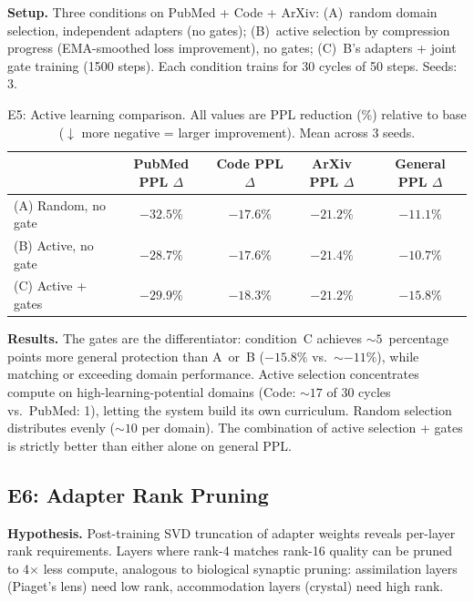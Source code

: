 \documentclass{article}
\begin{document}
\textbf{Setup.} Three conditions on PubMed + Code + ArXiv: (A)~random
domain selection, independent adapters (no gates); (B)~active selection
by compression progress (EMA-smoothed loss improvement), no gates;
(C)~B's adapters + joint gate training (1500 steps). Each condition
trains for 30 cycles of 50 steps. Seeds: 3.


\begin{table}[h]
\centering
\caption{E5: Active learning comparison. All values are PPL reduction
(\%) relative to base ($\downarrow$ more negative = larger
improvement). Mean across 3 seeds.}
\label{tab:e5}
\begin{tabular}{@{}lcccc@{}}
\toprule
& PubMed PPL $\Delta$ & Code PPL $\Delta$ & ArXiv PPL $\Delta$ & General PPL $\Delta$ \\
\midrule
(A) Random, no gate      & $-32.5\%$ & $-17.6\%$ & $-21.2\%$ & $-11.1\%$ \\
(B) Active, no gate      & $-28.7\%$ & $-17.6\%$ & $-21.4\%$ & $-10.7\%$ \\
(C) Active + gates       & $-29.9\%$ & $-18.3\%$ & $-21.2\%$ & $\mathbf{-15.8\%}$ \\
\bottomrule
\end{tabular}
\end{table}

\textbf{Results.} The gates are the differentiator: condition~C achieves
${\sim}5$~percentage points more general protection than A~or~B
($-15.8\%$ vs.\ ${\sim}{-}11\%$), while matching or exceeding domain
performance.  Active selection concentrates compute on
high-learning-potential domains (Code: ${\sim}17$ of 30 cycles vs.\
PubMed: 1), letting the system build its own curriculum.  Random
selection distributes evenly (${\sim}10$ per domain).  The combination
of active selection + gates is strictly better than either alone on
general PPL.

\subsection{E6: Adapter Rank Pruning}
\label{sec:e6}

\textbf{Hypothesis.} Post-training SVD truncation of adapter weights
reveals per-layer rank requirements. Layers where rank-4 matches rank-16
quality can be pruned to 4$\times$ less compute, analogous to biological
synaptic pruning: assimilation layers (Piaget's lens) need low rank,
accommodation layers (crystal) need high rank.
\end{document}
